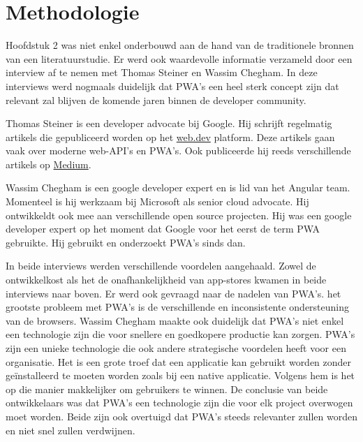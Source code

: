 
\chapter{Methodologie}
\label{ch:methodologie}


Hoofdstuk 2 was niet enkel onderbouwd aan de hand van de traditionele bronnen van een literatuurstudie. 
Er werd ook waardevolle informatie verzameld door een interview af te nemen met Thomas Steiner en Wassim Chegham. In deze interviews werd nogmaals duidelijk dat PWA's een heel sterk concept zijn dat relevant zal blijven de komende jaren binnen de developer community.

Thomas Steiner is een developer advocate bij Google. Hij schrijft regelmatig artikels die gepubliceerd worden op het \href{https://web.dev/authors/thomassteiner/}{web.dev} platform. Deze artikels gaan vaak over moderne web-API's en PWA's. Ook publiceerde hij reeds verschillende artikels op \href{https://medium.com/@tomayac}{Medium}.

Wassim Chegham is een google developer expert en is lid van het Angular team. Momenteel is hij werkzaam bij Microsoft als senior cloud advocate. Hij ontwikkeldt ook mee aan verschillende open source projecten. Hij was een google developer expert op het moment dat Google voor het eerst de term PWA gebruikte. Hij gebruikt en onderzoekt PWA's sinds dan.

In beide interviews werden verschillende voordelen aangehaald.  Zowel de ontwikkelkost als het de onafhankelijkheid van app-stores kwamen in beide interviews naar boven. Er werd ook gevraagd naar de nadelen van PWA's. het grootste probleem met PWA's is de verschillende en  inconsistente ondersteuning van de browsers.
Wassim Chegham maakte ook duidelijk dat PWA's niet enkel een technologie zijn die voor snellere en goedkopere productie kan zorgen. PWA's zijn een unieke technologie die ook andere strategische voordelen heeft voor een organisatie. Het is een grote troef dat een applicatie kan gebruikt worden zonder geïnstalleerd te moeten worden zoals bij een native applicatie. Volgens hem is het op die manier makkelijker om gebruikers te winnen.
De conclusie van beide ontwikkelaars was dat PWA's een technologie zijn die voor elk project overwogen moet worden. Beide zijn ook overtuigd dat PWA's steeds relevanter zullen worden en niet snel zullen verdwijnen.

